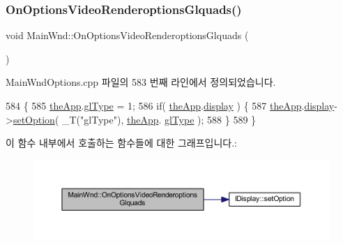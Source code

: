 \subsubsection{\texorpdfstring{On\+Options\+Video\+Renderoptions\+Glquads()}{OnOptionsVideoRenderoptionsGlquads()}}
{\footnotesize\ttfamily void Main\+Wnd\+::\+On\+Options\+Video\+Renderoptions\+Glquads (\begin{DoxyParamCaption}{ }\end{DoxyParamCaption})\hspace{0.3cm}{\ttfamily [protected]}}



Main\+Wnd\+Options.\+cpp 파일의 583 번째 라인에서 정의되었습니다.


\begin{DoxyCode}
584 \{
585     \mbox{\hyperlink{_v_b_a_8cpp_a8095a9d06b37a7efe3723f3218ad8fb3}{theApp}}.\mbox{\hyperlink{class_v_b_a_afb5faab6c2ddf2661b2fe19f118fd882}{glType}} = 1;
586     \textcolor{keywordflow}{if}( \mbox{\hyperlink{_v_b_a_8cpp_a8095a9d06b37a7efe3723f3218ad8fb3}{theApp}}.\mbox{\hyperlink{class_v_b_a_a940e5bad8b3ed2436888dbcd03bfd563}{display}} ) \{
587         \mbox{\hyperlink{_v_b_a_8cpp_a8095a9d06b37a7efe3723f3218ad8fb3}{theApp}}.\mbox{\hyperlink{class_v_b_a_a940e5bad8b3ed2436888dbcd03bfd563}{display}}->\mbox{\hyperlink{class_i_display_a1766244708c252bb8781892c76c20ba9}{setOption}}( \_T(\textcolor{stringliteral}{"glType"}), \mbox{\hyperlink{_v_b_a_8cpp_a8095a9d06b37a7efe3723f3218ad8fb3}{theApp}}.
      \mbox{\hyperlink{class_v_b_a_afb5faab6c2ddf2661b2fe19f118fd882}{glType}} );
588     \}
589 \}
\end{DoxyCode}
이 함수 내부에서 호출하는 함수들에 대한 그래프입니다.\+:
\nopagebreak
\begin{figure}[H]
\begin{center}
\leavevmode
\includegraphics[width=350pt]{class_main_wnd_adc9d14bd286462fdf5f04111352de799_cgraph}
\end{center}
\end{figure}
\mbox{\label{class_main_wnd_a80f5fb3891f417bc919adc26f5773a08}} 

